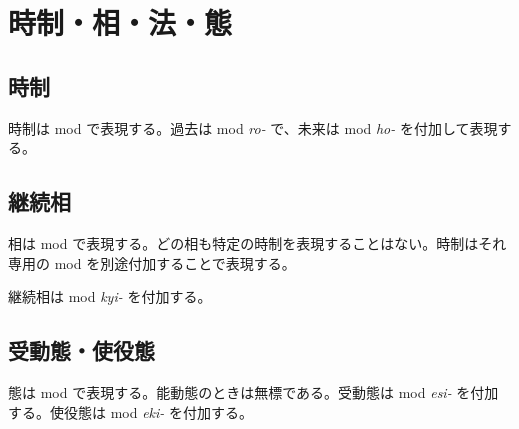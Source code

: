 \section{時制・相・法・態}

\subsection{時制}

時制は mod で表現する。過去は mod \emph{ro-} で、未来は mod \emph{ho-} を付加して表現する。

\subsection{継続相}

相は mod で表現する。どの相も特定の時制を表現することはない。時制はそれ専用の mod を別途付加することで表現する。

継続相は mod \emph{kyi-} を付加する。

\subsection{受動態・使役態}

態は mod で表現する。能動態のときは無標である。受動態は mod \emph{esi-} を付加する。使役態は mod \emph{eki-} を付加する。